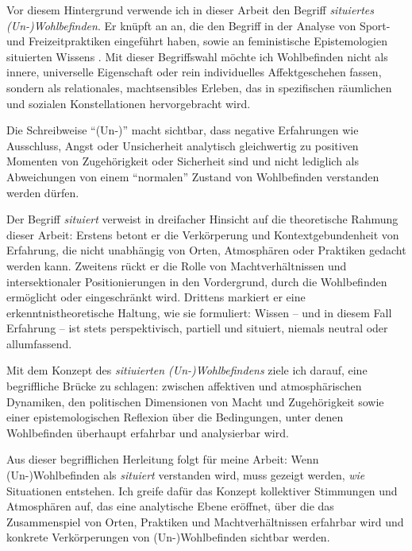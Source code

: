 Vor diesem Hintergrund verwende ich in dieser Arbeit den Begriff \emph{situiertes (Un\nobreakdash-)Wohlbefinden}. Er knüpft an \textcite{leeUnderstandingDisruptedParticipation2021} an, die den Begriff in der Analyse von Sport- und Freizeitpraktiken eingeführt haben, sowie an feministische Epistemologien situierten Wissens \parencite{harawaySituatedKnowledgesScience1988}. Mit dieser Begriffswahl möchte ich Wohlbefinden nicht als innere, universelle Eigenschaft oder rein individuelles Affektgeschehen fassen, sondern als relationales, machtsensibles Erleben, das in spezifischen räumlichen und sozialen Konstellationen hervorgebracht wird. 

Die Schreibweise \enquote{(Un\nobreakdash-)} macht sichtbar, dass negative Erfahrungen wie Ausschluss, Angst oder Unsicherheit analytisch gleichwertig zu positiven Momenten von Zugehörigkeit oder Sicherheit sind und nicht lediglich als Abweichungen von einem \enquote{normalen} Zustand von Wohlbefinden verstanden werden dürfen. 

Der Begriff \emph{situiert} verweist in dreifacher Hinsicht auf die theoretische Rahmung dieser Arbeit: Erstens betont er die Verkörperung und Kontextgebundenheit von Erfahrung, die nicht unabhängig von Orten, Atmosphären oder Praktiken gedacht werden kann. Zweitens rückt er die Rolle von Machtverhältnissen und intersektionaler Positionierungen in den Vordergrund, durch die Wohlbefinden ermöglicht oder eingeschränkt wird. Drittens markiert er eine erkenntnistheoretische Haltung, wie sie \textcite{harawaySituatedKnowledgesScience1988} formuliert: Wissen -- und in diesem Fall Erfahrung -- ist stets perspektivisch, partiell und situiert, niemals neutral oder allumfassend. 

Mit dem Konzept des \emph{sitiuierten (Un\nobreakdash-)Wohlbefindens} ziele ich darauf, eine begriffliche Brücke zu schlagen: zwischen affektiven und atmosphärischen Dynamiken, den politischen Dimensionen von Macht und Zugehörigkeit sowie einer epistemologischen Reflexion über die Bedingungen, unter denen Wohlbefinden überhaupt erfahrbar und analysierbar wird.

\vspace{1em}

Aus dieser begrifflichen Herleitung folgt für meine Arbeit: Wenn (Un\nobreakdash-)Wohlbefinden als \emph{situiert} verstanden wird, muss gezeigt werden, \emph{wie} Situationen entstehen. Ich greife dafür das Konzept kollektiver Stimmungen und Atmosphären auf, das eine analytische Ebene eröffnet, über die das Zusammenspiel von Orten, Praktiken und Machtverhältnissen erfahrbar wird und konkrete Verkörperungen von (Un\nobreakdash-)Wohlbefinden sichtbar werden.

